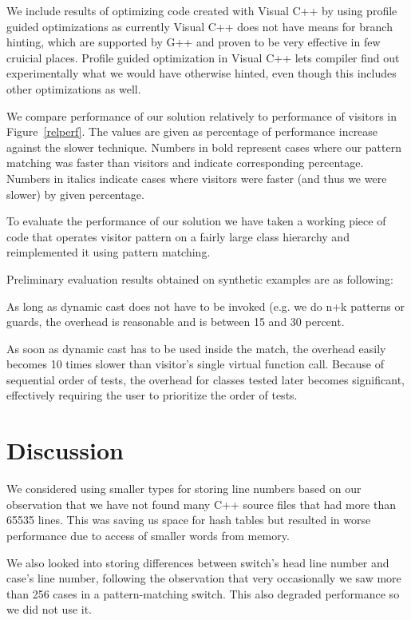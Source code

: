 \documentclass[preprint]{sigplanconf}
\begin{document}
We include results of optimizing code created with Visual C++ by using profile 
guided optimizations as currently Visual C++ does not have means for branch 
hinting, which are supported by G++ and proven to be very effective in few 
cruicial places. Profile guided optimization in Visual C++ lets compiler find 
out experimentally what we would have otherwise hinted, even though this 
includes other optimizations as well.

We compare performance of our solution relatively to performance of visitors in 
Figure~\ref{relperf}. The values are given as percentage of performance increase 
against the slower technique. Numbers in bold represent cases where our pattern 
matching was faster than visitors and indicate corresponding percentage. Numbers 
in italics indicate cases where visitors were faster (and thus we were slower) 
by given percentage.

To evaluate the performance of our solution we have taken a working piece of code 
that operates visitor pattern on a fairly large class hierarchy and 
reimplemented it using pattern matching.

Preliminary evaluation results obtained on synthetic examples are as following:

As long as dynamic cast does not have to be invoked (e.g. we do n+k patterns or 
guards, the overhead is reasonable and is between 15 and 30 percent.

As soon as dynamic cast has to be used inside the match, the overhead easily 
becomes 10 times slower than visitor's single virtual function call. Because of 
sequential order of tests, the overhead for classes tested later becomes 
significant, effectively requiring the user to prioritize the order of tests.

\section{Discussion} %
\label{sec:dsc}

We considered using smaller types for storing line numbers based on our 
observation that we have not found many C++ source files that had more than 65535 
lines. This was saving us space for hash tables but resulted in worse 
performance due to access of smaller words from memory.

We also looked into storing differences between switch's head line number and 
case's line number, following the observation that very occasionally we saw more 
than 256 cases in a pattern-matching switch. This also degraded performance so 
we did not use it.
\end{document}
